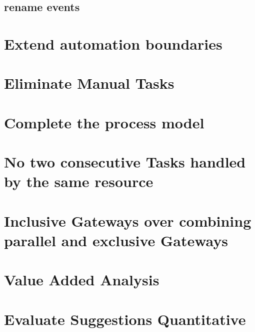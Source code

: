 \subsection{rename events}

\section{Extend automation boundaries}

\section{Eliminate Manual Tasks}

\section{Complete the process model}

\section{No two consecutive Tasks handled by the same resource}

\section{Inclusive Gateways over combining parallel and exclusive Gateways}

\section{Value Added Analysis}

\section{Evaluate Suggestions Quantitative}

